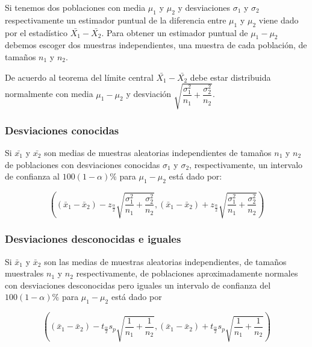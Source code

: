\documentclass[letterpaper,]{book}
\begin{document}
Si tenemos dos poblaciones con media \(\mu_1\) y \(\mu_2\) y desviaciones \(\sigma_1\) y \(\sigma_2\) respectivamente un estimador puntual de la diferencia entre \(\mu_1\) y \(\mu_2\) viene dado por el estadístico \(\bar{X_1}-\bar{X_2}\). Para obtener un estimador puntual de \(\mu_1-\mu_2\) debemos escoger dos muestras independientes, una muestra de cada población, de tamaños \(n_1\) y \(n_2\).

De acuerdo al teorema del límite central \(\bar{X_1}-\bar{X_2}\) debe estar distribuida normalmente con media \(\mu_1 - \mu_2\) y desviación \(\sqrt{\dfrac{\sigma_1^2}{n_1} + \dfrac{\sigma_2^2}{n_2}}\).

\hypertarget{desviaciones-conocidas}{%
\subsubsection{Desviaciones conocidas}\label{desviaciones-conocidas}}

Si \(\bar{x_1}\) y \(\bar{x_2}\) son medias de muestras aleatorias independientes de tamaños \(n_1\) y \(n_2\) de poblaciones con desviaciones conocidas \(\sigma_1\) y \(\sigma_2\), respectivamente, un intervalo de confianza al \(100\left(1-\alpha\right)\%\) para \(\mu_1-\mu_2\) está dado por:

\begin{equation} 
\left( \left( \bar{x}_1 - \bar{x}_2 \right) - z_{\frac{\alpha}{2}}\sqrt{\dfrac{\sigma_1^2}{n_1} + \dfrac{\sigma_2^2}{n_2}} , \left( \bar{x}_1 - \bar{x}_2 \right) + z_{\frac{\alpha}{2}}\sqrt{\dfrac{\sigma_1^2}{n_1} + \dfrac{\sigma_2^2}{n_2}} \right) 
\label{eq:ic2msc}
\end{equation}

\hypertarget{desviaciones-desconocidas-e-iguales}{%
\subsubsection{Desviaciones desconocidas e iguales}\label{desviaciones-desconocidas-e-iguales}}

Si \(\bar{x}_1\) y \(\bar{x}_2\) son las medias de muestras aleatorias independientes, de tamaños muestrales \(n_1\) y \(n_2\) respectivamente, de poblaciones aproximadamente normales con desviaciones desconocidas pero iguales un intervalo de confianza del \(100\left(1-\alpha \right)\%\) para \(\mu_1 - \mu_2\) está dado por

\begin{equation} 
\left( \left( \bar{x}_1 - \bar{x}_2 \right) - t_{\frac{\alpha}{2}}s_p\sqrt{\dfrac{1}{n_1} + \dfrac{1}{n_2}} , \left( \bar{x}_1 - \bar{x}_2 \right) + t_{\frac{\alpha}{2}}s_p\sqrt{\dfrac{1}{n_1} + \dfrac{1}{n_2}} \right) 
\label{eq:ic2msd}
\end{equation}
\end{document}
